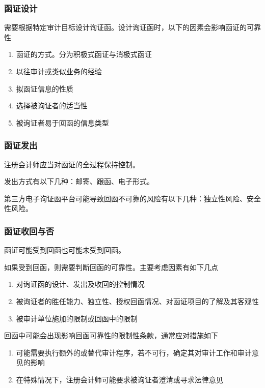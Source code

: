 \documentclass[UTF8,12pt]{ctexart}
\numberwithin{equation}{section} %
\numberwithin{figure}{section}
\numberwithin{table}{section}
\begin{document}
	\subsubsection{函证设计}
	需要根据特定审计目标设计询证函。设计询证函时，以下的因素会影响函证的可靠性
	\begin{enumerate}
		\item 函证的方式。分为积极式函证与消极式函证
		
		\item 以往审计或类似业务的经验
		
		\item 拟函证信息的性质
		
		\item 选择被询证者的适当性
		
		\item 被询证者易于回函的信息类型
	\end{enumerate}
	
	\subsubsection{函证发出}
	注册会计师应当对函证的全过程保持控制。
	
	发出方式有以下几种：邮寄、跟函、电子形式。
	
	第三方电子询证函平台可能导致回函不可靠的风险有以下几种：独立性风险、安全性风险。
	
	\subsubsection{函证收回与否}
	函证可能受到回函也可能未受到回函。
	
	如果受到回函，则需要判断回函的可靠性。主要考虑因素有如下几点
	\begin{enumerate}
		\item 对询证函的设计、发出及收回的控制情况
		
		\item 被询证者的胜任能力、独立性、授权回函情况、对函证项目的了解及其客观性
		
		\item 被审计单位施加的限制或回函中的限制
	\end{enumerate}
	
	回函中可能会出现影响回函可靠性的限制性条款，通常应对措施如下
	\begin{enumerate}
		\item 可能需要执行额外的或替代审计程序，若不可行，确定其对审计工作和审计意见的影响
		
		\item 在特殊情况下，注册会计师可能要求被询证者澄清或寻求法律意见
	\end{enumerate}
	
\end{document}

